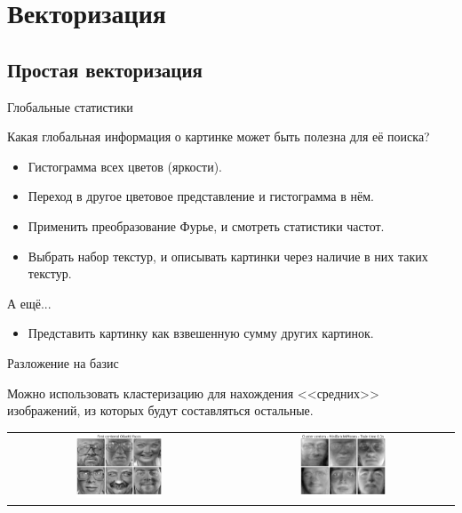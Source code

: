 \section{Векторизация}

\subsection{Простая векторизация}

\begin{frame}{Глобальные статистики}

Какая глобальная информация о картинке может быть полезна для её поиска?

\begin{itemize}
    \item Гистограмма всех цветов (яркости).
    \item Переход в другое цветовое представление и гистограмма в нём.
    \item Применить преобразование Фурье, и смотреть статистики частот.
    \item Выбрать набор текстур, и описывать картинки через наличие в них таких текстур.
\end{itemize}

А ещё...

\pause
\begin{itemize}
    \item Представить картинку как взвешенную сумму других картинок.
\end{itemize}
    
\end{frame}

\begin{frame}{Разложение на базис}

Можно использовать кластеризацию для нахождения <<средних>> изображений, из которых будут составляться остальные.

\centering
\begin{tabular}{cc}
    \includegraphics[width=0.4\textwidth]{images/faces/sphx_glr_plot_faces_decomposition_001.png} &
    \includegraphics[width=0.4\textwidth]{images/faces/sphx_glr_plot_faces_decomposition_007.png}
\end{tabular}

\end{frame}

